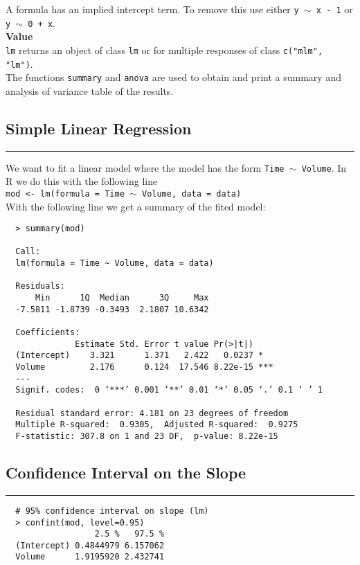A formula has an implied intercept term. To remove this use either \texttt{y $\sim$ x - 1} or \texttt{y $\sim$ 0 + x}.\\

\textbf{Value}\\
\texttt{lm} returns an object of class \texttt{lm} or for multiple responses of class \texttt{c("mlm", "lm")}.\\

The functions \texttt{summary} and \texttt{anova} are used to obtain and print a summary and analysis of variance table of the results.\\

\subsection{Simple Linear Regression}
\noindent\rule[\linienAbstand]{\linewidth}{\linienDicke}
We want to fit a linear model where the model has the form \texttt{Time $\sim$ Volume}. In R we do this with the following line\\
\texttt{mod <- lm(formula = Time $\sim$ Volume, data = data)}\\

With the following line we get a summary of the fited model:\\
\begingroup
\scriptsize
\begin{verbatim}
  > summary(mod)

  Call:
  lm(formula = Time ~ Volume, data = data)

  Residuals:
      Min      1Q  Median      3Q     Max
  -7.5811 -1.8739 -0.3493  2.1807 10.6342

  Coefficients:
              Estimate Std. Error t value Pr(>|t|)
  (Intercept)    3.321      1.371   2.422   0.0237 *
  Volume         2.176      0.124  17.546 8.22e-15 ***
  ---
  Signif. codes:  0 ‘***’ 0.001 ‘**’ 0.01 ‘*’ 0.05 ‘.’ 0.1 ‘ ’ 1

  Residual standard error: 4.181 on 23 degrees of freedom
  Multiple R-squared:  0.9305,	Adjusted R-squared:  0.9275
  F-statistic: 307.8 on 1 and 23 DF,  p-value: 8.22e-15
\end{verbatim}
\endgroup
\vspace{\baselineskip}

\subsection{Confidence Interval on the Slope}
\noindent\rule[\linienAbstand]{\linewidth}{\linienDicke}
\begingroup
\scriptsize
\begin{verbatim}
  # 95% confidence interval on slope (lm)
  > confint(mod, level=0.95)
                  2.5 %   97.5 %
  (Intercept) 0.4844979 6.157062
  Volume      1.9195920 2.432741
\end{verbatim}
\endgroup
\vspace{\baselineskip}

